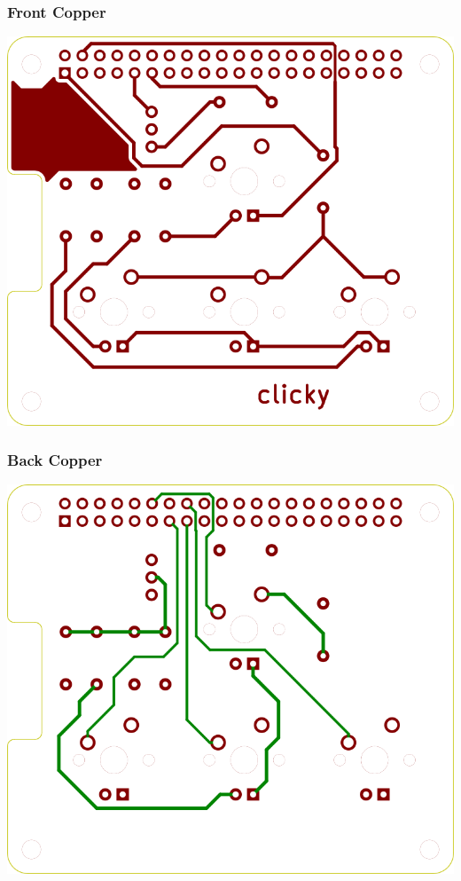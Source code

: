 \documentclass[10pt, a4paper, onesided]{article}
\begin{document}
		\subsubsection*{Front Copper}
			\begin{center}
				\includegraphics[width=0.7\linewidth]{img/F_Cu}
			\end{center}
		\subsubsection*{Back Copper}
		\begin{center}
			\includegraphics[width=0.7\linewidth]{img/B_Cu}
		\end{center}
\end{document}
